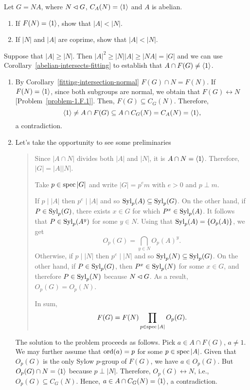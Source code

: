 \begin{probl} Let\/ $G=NA$, where\/ $N\lhd G$, $C_A(N)=\langle1\rangle$ and\/ $A$ is abelian.
    \begin{enumerate}[\rm a)]
    \item If\/ $F(N)=\langle1\rangle$, show that\/ $|A|<|N|$.
    \item If\/ $|N|$ and\/ $|A|$ are coprime, show that\/ $|A|<|N|$.
    \end{enumerate}
\end{probl} 

\begin{solution} Suppose that $|A|\ge|N|$. Then $|A|^2\ge|N||A|\ge |NA|=|G|$ and we can use Corollary~\ref{abelian-intersects-fitting} to establish that $A\cap F(G)\ne\langle1\rangle$.

\begin{enumerate}[\rm a)]
    \item By Corollary~\ref{fitting-intersection-normal} $F(G)\cap N=F(N)$. If $F(N)=\langle1\rangle$, since both subgroups are normal, we obtain that $F(G)\leftrightarrow N$ [Problem~\ref{problem-1.F.1}]. Then, $F(G)\subseteq C_G(N)$. Therefore,
    $$
        \langle1\rangle\ne A\cap F(G)\subseteq A\cap C_G(N)=C_A(N)=\langle1\rangle,
    $$
    a contradiction.
        
    \item Let's take the opportunity to see some preliminaries
    
    \begin{quote}\small
        Since $|A\cap N|$ divides both $|A|$ and $|N|$, it is $A\cap N=\langle1\rangle$. Therefore, $|G|=|A||N|$.
        
        Take $p\in\operatorname{spec}|G|$ and write $|G|=p^em$ with $e>0$ and $p\perp m$.
        
        If $p\mid|A|$ then $p^e\mid |A|$ and so ${\rm Syl}_p(A)\subseteq{\rm Syl}_p(G)$. On the other hand, if $P\in{\rm Syl}_p(G)$, there exists $x\in G$ for which $P^x\in{\rm Syl}_p(A)$. It follows that $P\in{\rm Syl}_p(A^y)$ for some $y\in N$. Using that ${\rm Syl}_p(A)=\{O_p(A)\}$, we get
        $$
            O_p(G)=\bigcap_{y\in N}O_p(A)^y.
        $$
        Otherwise, if $p\mid|N|$ then $p^e\mid|N|$ and so ${\rm Syl}_p(N)\subseteq{\rm Syl}_p(G)$. On the other hand, if $P\in{\rm Syl}_p(G)$, then $P^x\in{\rm Syl}_p(N)$ for some $x\in G$, and therefore $P\in{\rm Syl}_p(N)$ because $N\lhd G$. As a result, $O_p(G)=O_p(N)$.
    
        In sum,
        $$
            F(G) = F(N)\prod_{p\in\operatorname{spec}|A|}O_p(G).
        $$
        \end{quote}
    
    The solution to the problem proceeds as follows. Pick $a\in A\cap F(G)$, $a\ne1$. We may further assume that ${\rm ord}(a)=p$ for some $p\in\operatorname{spec}|A|$. Given that $O_p(G)$ is the only Sylow $p$-group of $F(G)$, we have $a\in O_p(G)$. But $O_p(G)\cap N=\langle1\rangle$ because $p\perp|N|$. Therefore, $O_p(G)\leftrightarrow N$, i.e., $O_p(G)\subseteq C_G(N)$. Hence, $a\in A\cap C_G(N)=\langle1\rangle$, a contradiction.
\end{enumerate}
\end{solution}


